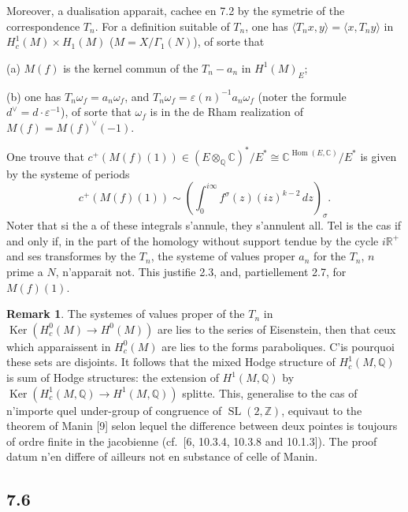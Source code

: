 \documentclass[12pt,a4paper]{article}
\theoremstyle{plain}
\theoremstyle{definition}
\newtheorem{remark}[definition]{Remark}
\theoremstyle{remark}
\DeclareMathOperator{\Hom}{Hom}
\DeclareMathOperator{\Ker}{Ker}
\DeclareMathOperator{\SL}{SL}
\newcommand{\Q}{\mathbb{Q}}
\newcommand{\R}{\mathbb{R}}
\newcommand{\C}{\mathbb{C}}
\newcommand{\Z}{\mathbb{Z}}
\begin{document}
Moreover, a dualisation apparait, cachee en 7.2 by the symetrie of the
correspondence $T_n$. For a definition suitable of $T_n$, one has
$\langle T_n x, y \rangle = \langle x, T_n y \rangle$ in $H^1_c(M) \times H_1(M)$ ($M = X/\Gamma_1(N)$), of
sorte that

(a) $M(f)$ is the kernel commun of the $T_n - a_n$ in $H^1(M)_E$;

(b) one has $T_n \omega_f = a_n \omega_f$, and $T_n \omega_f = \varepsilon(n)^{-1} a_n \omega_f$ (noter the formule
$d^\vee = d \cdot \varepsilon^{-1}$), of sorte that $\omega_f$ is in the de Rham realization of $M(f) = M(f)^\vee(-1)$.

One trouve that $c^+(M(f)(1)) \in (E \otimes_\Q \C)^*/E^* \cong \C^{\Hom(E,\C)}/E^*$
is given by the systeme of periods
\[
c^+(M(f)(1)) \sim \left(\int_0^{i\infty} f^\sigma(z) (iz)^{k-2} \, dz\right)_\sigma.
\]
Noter that si the a of these integrals s'annule, they s'annulent all. Tel is the cas if and only if, in the part of the homology without support tendue by the cycle
$i\R^+$ and ses transformes by the $T_n$, the systeme of values proper $a_n$ for the
$T_n$, $n$ prime a $N$, n'apparait not. This justifie 2.3, and, partiellement 2.7, for
$M(f)(1)$.

\begin{remark}
The systemes of values proper of the $T_n$ in
$\Ker(H^0_c(M) \to H^0(M))$ are lies to the series of Eisenstein, then that ceux which
apparaissent in $H^0_c(M)$ are lies to the forms paraboliques. C'is pourquoi these
sets are disjoints. It follows that the mixed Hodge structure of
$H^1_c(M, \Q)$ is sum of Hodge structures: the extension of $H^1(M, \Q)$ by
$\Ker(H^1_c(M, \Q) \to H^1(M, \Q))$ splitte. This, generalise to the cas of n'importe
quel under-group of congruence of $\SL(2, \Z)$, equivaut to the theorem of Manin [9]
selon lequel the difference between deux pointes is toujours of ordre finite in the
jacobienne (cf.~[6, 10.3.4, 10.3.8 and 10.1.3]). The proof datum n'en differe
of ailleurs not en substance of celle of Manin.
\end{remark}

\subsection*{7.6}
\end{document}

